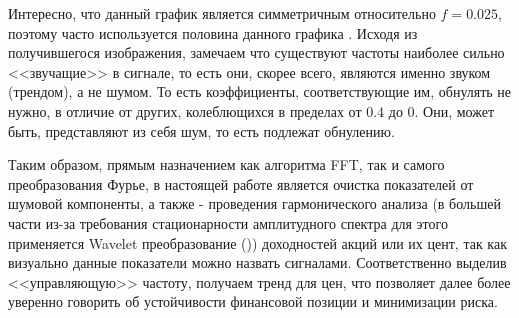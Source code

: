 Интересно, что данный график является симметричным относительно $f = 0.025$, поэтому часто используется половина данного графика \cite{brunton2022data}. Исходя из получившегося изображения, замечаем что существуют частоты наиболее сильно <<звучащие>> в сигнале, то есть они, скорее всего, являются именно звуком (трендом), а не шумом. То есть коэффициенты, соответствующие им, обнулять не нужно, в отличие от других, колеблющихся в пределах от $0.4$ до 0. Они, может быть, представляют из себя шум, то есть подлежат обнулению.

Таким образом, прямым назначением как алгоритма FFT, так и самого преобразования Фурье, в настоящей работе является очистка показателей от шумовой компоненты, а также - проведения гармонического анализа  (в большей части из-за требования стационарности амплитудного спектра для этого применяется Wavelet преобразование ()) доходностей акций или их цент, так как визуально данные показатели можно назвать сигналами. Соответственно выделив <<управляющую>> частоту, получаем тренд для цен, что позволяет далее более уверенно говорить об устойчивости финансовой позиции и минимизации риска.